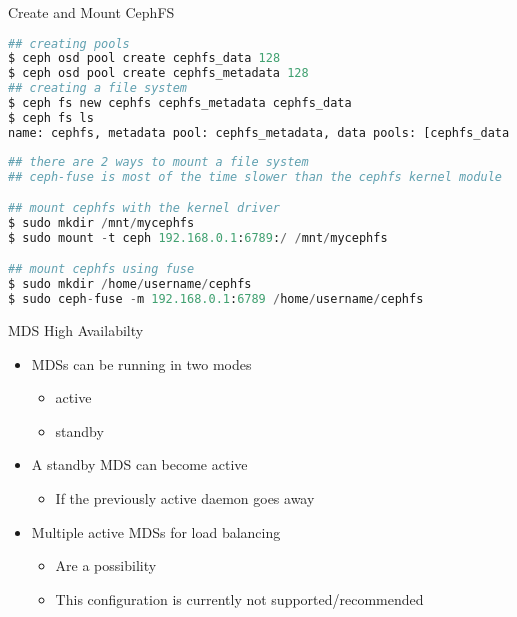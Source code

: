 
\begin{frame}[fragile]{Create and Mount CephFS}
\begin{lstlisting}[language=python]
## creating pools
$ ceph osd pool create cephfs_data 128
$ ceph osd pool create cephfs_metadata 128
## creating a file system
$ ceph fs new cephfs cephfs_metadata cephfs_data
$ ceph fs ls
name: cephfs, metadata pool: cephfs_metadata, data pools: [cephfs_data ]
\end{lstlisting}

\begin{lstlisting}[language=python]
## there are 2 ways to mount a file system
## ceph-fuse is most of the time slower than the cephfs kernel module

## mount cephfs with the kernel driver
$ sudo mkdir /mnt/mycephfs
$ sudo mount -t ceph 192.168.0.1:6789:/ /mnt/mycephfs

## mount cephfs using fuse
$ sudo mkdir /home/username/cephfs
$ sudo ceph-fuse -m 192.168.0.1:6789 /home/username/cephfs
\end{lstlisting}
\end{frame}

\begin{frame}{MDS High Availabilty}
    \begin{itemize}
        \item MDSs can be running in two modes
            \begin{itemize}
                \item active
                \item standby
            \end{itemize}
        \item A standby MDS can become active
            \begin{itemize}
                \item If the previously active daemon goes away
            \end{itemize}
        \item Multiple active MDSs for load balancing
            \begin{itemize}
                \item Are a possibility
                \item This configuration is currently not supported/recommended
            \end{itemize}
    \end{itemize}
\end{frame}

